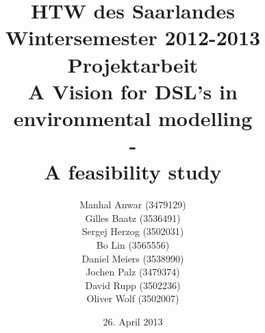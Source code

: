 


\title{%
\large HTW des Saarlandes\\
Wintersemester 2012-2013\\
Projektarbeit\\[10mm]
{\LARGE A Vision for DSL's in environmental modelling}\\
{\LARGE -}\\
{\LARGE A feasibility study}\\[10mm]
}

\author{%
Manhal Anwar (3479129)\\[1mm]
Gilles Baatz (3536491)\\[1mm]
Sergej Herzog (3502031)\\[1mm]
Bo Lin (3565556)\\[1mm]
Daniel Meiers (3538990)\\[1mm]
Jochen Palz (3479374)\\[1mm]
David Rupp (3502236)\\[1mm]
Oliver Wolf (3502007)\\[1mm]
}

\date{26. April 2013}



\maketitle

\tableofcontents
\listoffigures


 













\printbibliography


